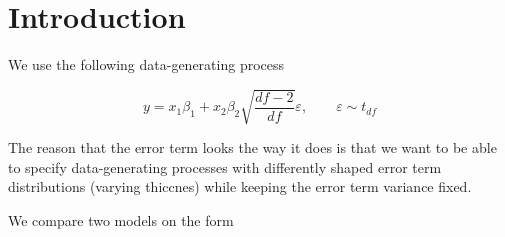 \documentclass{article}
\begin{document}
\section{Introduction}

We use the following data-generating process

\begin{equation*}
    y = x_1 \beta_1 + x_2 \beta_2 \sqrt{\frac{df-2}{df}}\varepsilon, \qquad \varepsilon \sim t_{df}
\end{equation*}

The reason that the error term looks the way it does is that we want to be able to specify data-generating processes with differently shaped error term distributions (varying thiccnes) while keeping the error term variance fixed.

We compare two models on the form
\end{document}
